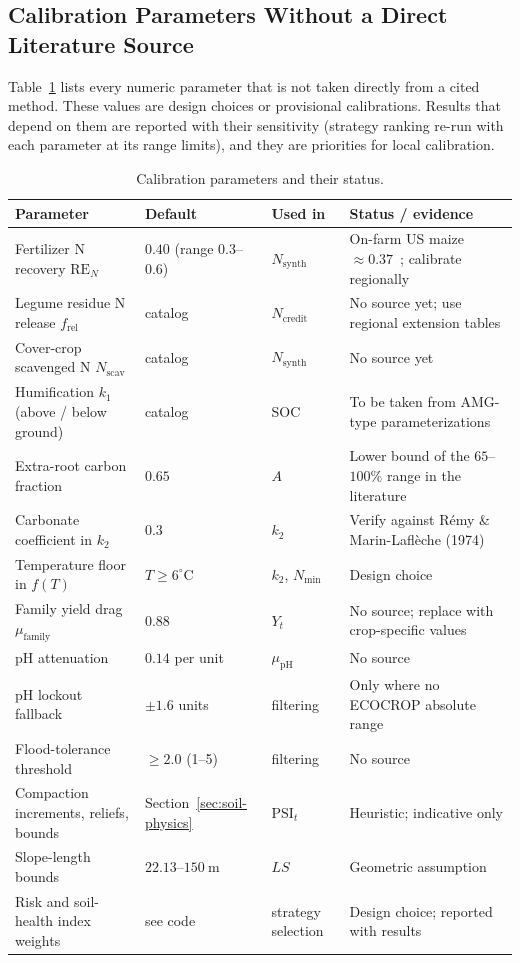 \subsection{Calibration Parameters Without a Direct Literature Source}
Table~\ref{tab:calibration} lists every numeric parameter that is not taken directly from a cited method. These values are design choices or provisional calibrations. Results that depend on them are reported with their sensitivity (strategy ranking re-run with each parameter at its range limits), and they are priorities for local calibration.

\begin{table}[htbp]
  \centering
  \small
  \caption{Calibration parameters and their status.}
  \label{tab:calibration}
  \begin{tabular}{@{}p{4.2cm}p{2.3cm}p{2.4cm}p{6.2cm}@{}}
    \toprule
    \textbf{Parameter} & \textbf{Default} & \textbf{Used in} & \textbf{Status / evidence} \\
    \midrule
    Fertilizer N recovery $\mathrm{RE}_N$ & $0.40$ (range $0.3$--$0.6$) & $N_{\mathrm{synth}}$ & On-farm US maize $\approx 0.37$~\cite{cassman2002agroecosystems}; calibrate regionally \\
    Legume residue N release $f_{\mathrm{rel}}$ & catalog & $N_{\mathrm{credit}}$ & No source yet; use regional extension tables \\
    Cover-crop scavenged N $N_{\mathrm{scav}}$ & catalog & $N_{\mathrm{synth}}$ & No source yet \\
    Humification $k_1$ (above / below ground) & catalog & SOC & To be taken from AMG-type parameterizations \\
    Extra-root carbon fraction & $0.65$ & $A$ & Lower bound of the $65$--$100\%$ range in the literature \\
    Carbonate coefficient in $k_2$ & $0.3$ & $k_2$ & Verify against R{\'e}my \& Marin-Lafl{\`e}che (1974) \\
    Temperature floor in $f(T)$ & $T \ge 6^{\circ}\mathrm{C}$ & $k_2$, $N_{\mathrm{min}}$ & Design choice \\
    Family yield drag $\mu_{\mathrm{family}}$ & $0.88$ & $Y_t$ & No source; replace with crop-specific values \\
    pH attenuation & $0.14$ per unit & $\mu_{\mathrm{pH}}$ & No source \\
    pH lockout fallback & $\pm 1.6$ units & filtering & Only where no ECOCROP absolute range \\
    Flood-tolerance threshold & $\ge 2.0$ (1--5) & filtering & No source \\
    Compaction increments, reliefs, bounds & Section~\ref{sec:soil-physics} & $\mathrm{PSI}_t$ & Heuristic; indicative only \\
    Slope-length bounds & $22.13$--$150~\mathrm{m}$ & $LS$ & Geometric assumption \\
    Risk and soil-health index weights & see code & strategy selection & Design choice; reported with results \\
    \bottomrule
  \end{tabular}
\end{table}

